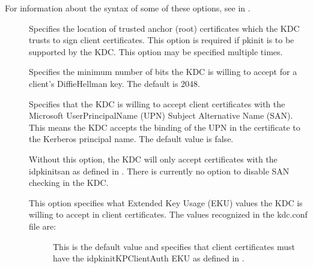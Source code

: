 \documentclass[letterpaper,10pt,english]{sphinxmanual}
\begin{document}
\sphinxAtStartPar
For information about the syntax of some of these options, see
{\hyperref[\detokenize{admin/conf_files/krb5_conf:pkinit-identity}]{}} in
{\hyperref[\detokenize{admin/conf_files/krb5_conf:krb5-conf-5}]{}}.
\begin{description}
\item[{}] \leavevmode
\sphinxAtStartPar
Specifies the location of trusted anchor (root) certificates which
the KDC trusts to sign client certificates.  This option is
required if pkinit is to be supported by the KDC.  This option may
be specified multiple times.

\item[{}] \leavevmode
\sphinxAtStartPar
Specifies the minimum number of bits the KDC is willing to accept
for a client’s Diffie\sphinxhyphen{}Hellman key.  The default is 2048.

\item[{}] \leavevmode
\sphinxAtStartPar
Specifies that the KDC is willing to accept client certificates
with the Microsoft UserPrincipalName (UPN) Subject Alternative
Name (SAN).  This means the KDC accepts the binding of the UPN in
the certificate to the Kerberos principal name.  The default value
is false.

\sphinxAtStartPar
Without this option, the KDC will only accept certificates with
the id\sphinxhyphen{}pkinit\sphinxhyphen{}san as defined in .  There is currently
no option to disable SAN checking in the KDC.

\item[{}] \leavevmode
\sphinxAtStartPar
This option specifies what Extended Key Usage (EKU) values the KDC
is willing to accept in client certificates.  The values
recognized in the kdc.conf file are:
\begin{description}
\item[{}] \leavevmode
\sphinxAtStartPar
This is the default value and specifies that client
certificates must have the id\sphinxhyphen{}pkinit\sphinxhyphen{}KPClientAuth EKU as
defined in .


\end{description}
\end{description}
\end{document}
